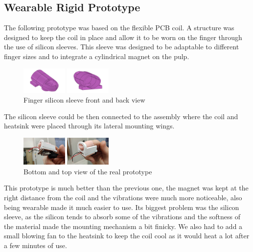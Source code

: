 \subsection{Wearable Rigid Prototype}
The following prototype was based on the flexible PCB coil. A structure was designed to keep the coil in place and allow it to be worn on the finger through the use of silicon sleeves.
This sleeve was designed to be adaptable to different finger sizes and to integrate a cylindrical magnet on the pulp.
\begin{figure}[H]
    \centering
    \begin{subcaptiongroup}
        \centering
        \parbox[b]{0.2\textwidth}{
            \centering
            \includegraphics[width=0.2\textwidth]{Figures/silicon_sleeve_front.png}
        }
        \parbox[b]{0.2\textwidth}{
            \centering
            \includegraphics[width=0.2\textwidth]{Figures/silicon_sleeve_back.png}        
        }
    \end{subcaptiongroup}
    \caption{Finger silicon sleeve front and back view}
\end{figure}
The silicon sleeve could be then connected to the assembly where the coil and heatsink were placed through its lateral mounting wings.
\begin{figure}[H]
    \centering
    \begin{subcaptiongroup}
        \centering
        \parbox[b]{0.2\textwidth}{
            \centering
            \includegraphics[width=0.2\textwidth]{Figures/rigid_prot_btm.png}
        }
        \parbox[b]{0.2\textwidth}{
            \centering
            \includegraphics[width=0.2\textwidth]{Figures/rigid_prot_top.png}
        }
    \end{subcaptiongroup}
    \caption{Bottom and top view of the real prototype}
\end{figure}
This prototype is much better than the previous one, the magnet was kept at the right distance from the coil and the vibrations were much more noticeable, also being wearable made it much easier to use.
Its biggest problem was the silicon sleeve, as the silicon tends to absorb some of the vibrations and the softness of the material made the mounting mechanism a bit finicky.  
We also had to add a small blowing fan to the heatsink to keep the coil cool as it would heat a lot after a few minutes of use.

